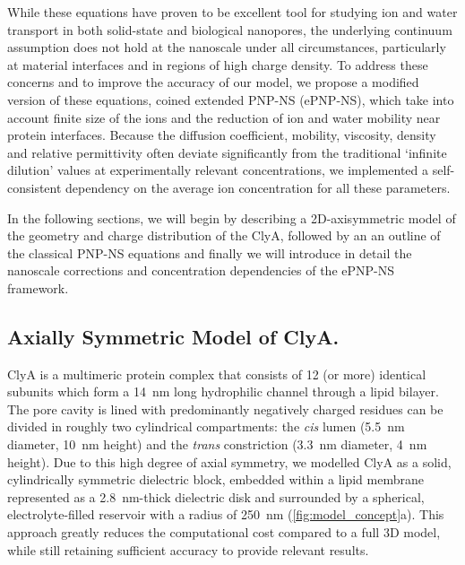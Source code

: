 \documentclass[journal=ancac3, manuscript=article, etalmode=truncate,maxauthors=0]{achemso}
\begin{document}
While these equations have proven to be excellent tool for studying ion and water transport in both solid-state\cite{daiguji2004,lu2012,chaudhry2014,rempfer2016,lin2016}
and biological nanopores,\cite{eisenberg1996,simakov2010,pederson2015} the underlying continuum assumption does not hold at the nanoscale under all circumstances,
particularly at material interfaces\cite{vo2016} and in regions of high charge density.\cite{corry2000}
To address these concerns and to improve the accuracy of our model, we propose a modified version of these equations, coined extended PNP-NS (ePNP-NS),
which take into account finite size of the ions\cite{borukhov1997,lu2011} and the reduction of ion and water mobility near protein interfaces.\cite{makarov1998, pronk2013}
Because the diffusion coefficient, mobility, viscosity, density\cite{} and relative permittivity\cite{gavish2016} often deviate significantly from the traditional `infinite dilution'
values at experimentally relevant concentrations, we implemented a self-consistent dependency on the average ion concentration for all these parameters.

In the following sections, we will begin by describing a 2D-axisymmetric model of the geometry and charge distribution of the ClyA,
followed by an an outline of the classical PNP-NS equations and finally we will introduce in detail the nanoscale corrections and concentration dependencies of the ePNP-NS framework.

\subsection{Axially Symmetric Model of ClyA.}

ClyA is a multimeric protein complex that consists of 12 (or more) identical subunits which form a \SI{14}{\nano\meter} long hydrophilic channel through a lipid bilayer.
The pore cavity is lined with predominantly negatively charged residues can be divided in roughly two cylindrical compartments:
the \textit{cis} lumen (\SI{5.5}{\nano\meter} diameter, \SI{10}{\nano\meter} height) and
the \textit{trans} constriction (\SI{3.3}{\nano\meter} diameter, \SI{4}{\nano\meter} height).
Due to this high degree of axial symmetry, we modelled ClyA as a solid, cylindrically symmetric dielectric block,
embedded within a lipid membrane represented as a \SI{2.8}{\nano\meter}-thick\cite{kucerka2011} dielectric disk
and surrounded by a spherical, electrolyte-filled reservoir with a radius of \SI{250}{\nano\meter} (\cref{fig:model_concept}a).\cite{lu2012,pederson2015}
This approach greatly reduces the computational cost compared to a full 3D model, while still retaining sufficient accuracy to provide relevant results.
\end{document}
